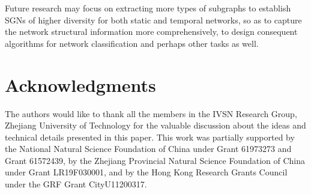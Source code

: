 \documentclass[10pt,journal,compsoc]{IEEEtran}
\begin{document}
Future research may focus on extracting more types of subgraphs to establish SGNs of higher diversity for both static and temporal networks, so as to capture the network structural information more comprehensively, to design consequent algorithms for network classification and perhaps other tasks as well.


\section*{Acknowledgments}
The authors would like to thank all the members in the IVSN Research Group, Zhejiang University of Technology for the valuable discussion about the ideas and technical details presented in this paper. This work was partially supported by the National Natural Science Foundation of China under Grant 61973273 and Grant 61572439, by the Zhejiang Provincial Natural Science Foundation of China under Grant LR19F030001, and by the Hong Kong Research Grants Council under the GRF Grant CityU11200317.

\ifCLASSOPTIONcaptionsoff
  \newpage
\fi



\end{document}
